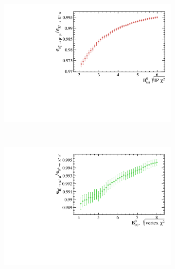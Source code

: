 \begin{figure}
    \centering
    \begin{subfigure}[b]{0.4\textwidth}
        \includegraphics[width=\textwidth]{./Figs/Selection/Bs2MuMu_KPi_IP.pdf}
        \caption{ }
        \label{fig:IPS_ratioKPi}
    \end{subfigure}
    ~ %
    \begin{subfigure}[b]{0.4\textwidth}
        \includegraphics[width=\textwidth]{./Figs/Selection/BSMuMu_KPi_vertex.pdf}
        \caption{ }
        \label{fig:CHI2_ratioKPi}
    \end{subfigure}
    ~ %


\end{figure}
